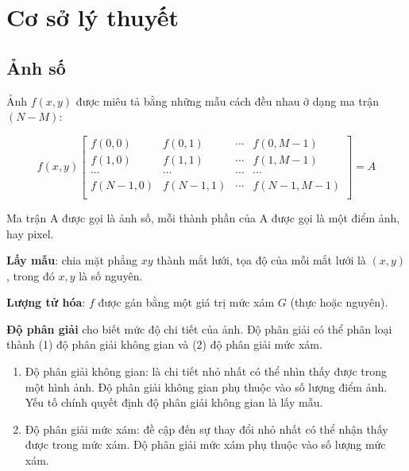 \section{Cơ sở lý thuyết}

\subsection{Ảnh số}

Ảnh $f(x,y)$ được miêu tả bằng những mẫu cách đều nhau ở dạng ma trận $(N-M)$:

$$f(x,y) \begin{bmatrix}
f(0,0) & f(0,1) & \cdots & f(0,M-1) \\
f(1,0) & f(1,1) & \cdots & f(1,M-1) \\
\cdots & \cdots & \cdots & \cdots \\
f(N-1,0) & f(N-1,1) & \cdots & f(N-1,M-1) \\
\end{bmatrix} = A$$

Ma trận A được gọi là ảnh số, mỗi thành phần của A được gọi là một điểm ảnh, hay pixel.

\textbf{Lấy mẫu}: chia mặt phẳng $xy$ thành mắt lưới, tọa độ của mỗi mắt lưới là $(x,y)$, trong đó $x,y$ là số nguyên.

\textbf{Lượng tử hóa}: $f$ được gán bằng một giá trị mức xám $G$ (thực hoặc nguyên).

\textbf{Độ phân giải} cho biết mức độ chi tiết của ảnh. Độ phân giải có thể phân loại thành (1) độ phân giải không gian và (2) độ phân giải mức xám.

\begin{enumerate}
    \item Độ phân giải không gian: là chi tiết nhỏ nhất có thể nhìn thấy được trong một hình ảnh. 
    Độ phân giải không gian phụ thuộc vào số lượng điểm ảnh. 
    Yếu tố chính quyết định độ phân giải không gian là lấy mẫu.

    \item Độ phân giải mức xám: đề cập đến sự thay đổi nhỏ nhất có thể nhận thấy được trong mức xám.
    Độ phân giải mức xám phụ thuộc vào số lượng mức xám.
\end{enumerate}

